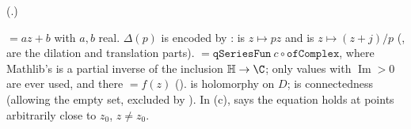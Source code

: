 (.)
\begin{dictionary}
 $=az+b$ with $a,b$ real.  $\Delta(p)$ is encoded by :  is $z\mapsto pz$ and
 is $z\mapsto(z+j)/p$ (,  are the dilation and translation parts).
 $=\mathtt{qSeriesFun}\ c\circ\mathtt{ofComplex}$, where Mathlib's  is a
partial inverse of the inclusion $\chnineteenH\to\C$; only values with $\operatorname{Im}>0$ are ever used, and there
 $=f(z)$ ().   is holomorphy on $D$;
 is connectedness (allowing the empty set, excluded by ).  In (c),
 says the equation holds at points arbitrarily close to $z_0$, $z\ne z_0$.
\end{dictionary}
